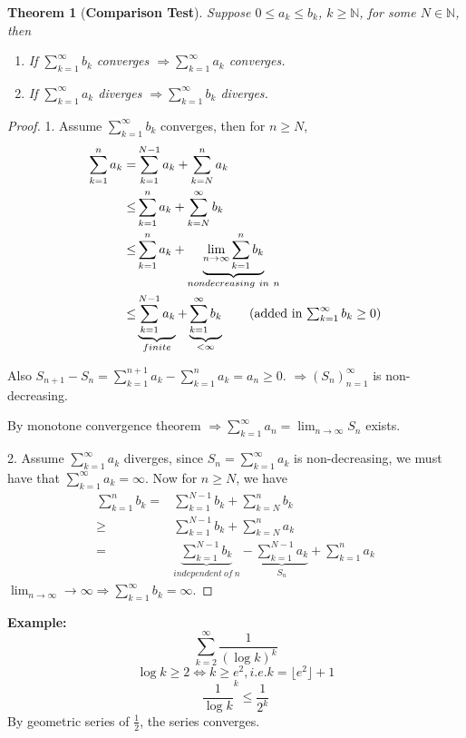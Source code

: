 \documentclass[12pt]{article}
\theoremstyle{plain}
\newtheorem{theorem}{Theorem}[subsection]
\newcommand{\mN}{{\mathbb{N}}}
\begin{document}
\begin{theorem}[\textbf{Comparison Test}]
	Suppose $0\leq a_k \leq b_k$, $k \geq \mN$, for some $N\in \mN$, 
	then 
	\begin{enumerate}
		\item If $\sum_{k=1}^{\infty} b_k$ converges $\Rightarrow 
			\sum_{k=1}^{\infty} a_k$ converges. 
		\item If $\sum_{k=1}^{\infty} a_k$ diverges $\Rightarrow 
			\sum_{k=1}^{\infty} b_k$ diverges.
	\end{enumerate}
\end{theorem}
\begin{proof}
	1. Assume $\sum_{k=1}^{\infty} b_k$ converges, then for $n\geq N$, 
	\begin{align*}
		\sum_{k=1}^n a_k 
		=& \sum_{k=1}^{N-1} a_k + \sum_{k=N}^n a_k		\\
		\leq& \sum_{k=1}^n a_k + \sum_{k=N}^{\infty} b_k	\\
		\leq& \sum_{k=1}^n a_k +\underbrace{\lim_{n\to\infty} \sum_{k=1}^n b_k}
		_{nondecreasing \ in\ n} \\
		\leq& \underbrace{\sum_{k=1}^{N-1} a_k}_{finite}
		+ \underbrace{\sum_{k=1}^{\infty} b_k }_{<\infty}
		\tag{added in $\sum_{k=1}^{\infty} b_k \geq 0$} 
	\end{align*}

	Also $S_{n+1} - S_n = \sum_{k=1}^{n+1} a_k - \sum_{k=1}^n a_k = a_n \geq 0$.
	$\Rightarrow (S_n)_{n=1}^{\infty}$ is non-decreasing. 

	By monotone convergence theorem $\Rightarrow \sum_{k=1}^{\infty} a_n =
	\lim_{n\to\infty} S_n$ exists. 

	2. Assume $\sum_{k=1}^{\infty}a_k$ diverges, since 
	$S_n = \sum_{k=1}^{\infty} a_k$ is non-decreasing, we must have that 
	$\sum_{k=1}^{\infty} a_k = \infty$. Now for $n\geq N$, we have
	\begin{align*}
		\sum_{k=1}^n b_k 
		=& \sum_{k=1}^{N-1}b_k + \sum_{k=N}^n b_k	\\
		\geq& \sum_{k=1}^{N-1} b_k + \sum_{k=N}^n a_k	\\
		=& \underbrace{\sum_{k=1}^{N-1} b_k}_{independent\ of\ n}
		- \underbrace{\sum_{k=1}^{N-1}a_k}_{S_n} + \sum_{k=1}^n a_k 
	\end{align*}
	$\lim_{n\to\infty} \to \infty \Rightarrow \sum_{k=1}^{\infty}b_k = \infty$.
\end{proof}

{\color{Brown}
	\textbf{Example: }
	\[
		\sum_{k=2}^{\infty} \frac 1{(\log k)^k} 
	\]
	\[
		\log k \geq 2 \Leftrightarrow k \geq e^2, i.e. k = \lfloor e^2 \rfloor+1
	\]
	\[
		\frac1{\log k}^k \leq \frac1{2^k}
	\]
	By geometric series of $\frac 12$, the series converges. 

}
\end{document}
